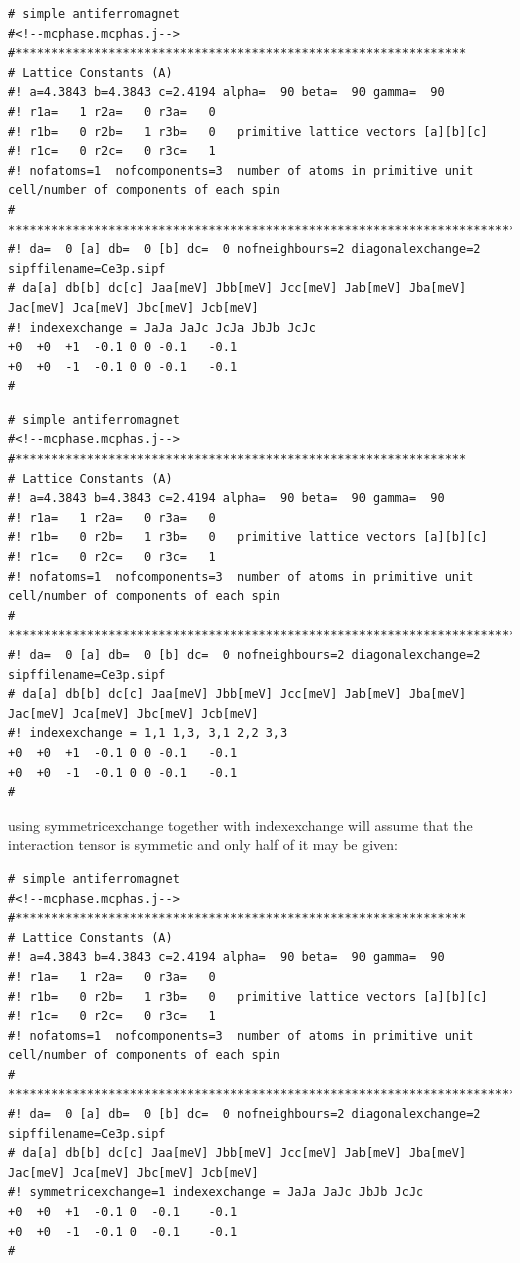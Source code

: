 {\small
\begin{verbatim} 
# simple antiferromagnet 
#<!--mcphase.mcphas.j-->
#***************************************************************
# Lattice Constants (A)
#! a=4.3843 b=4.3843 c=2.4194 alpha=  90 beta=  90 gamma=  90
#! r1a=   1 r2a=   0 r3a=   0
#! r1b=   0 r2b=   1 r3b=   0   primitive lattice vectors [a][b][c]
#! r1c=   0 r2c=   0 r3c=   1
#! nofatoms=1  nofcomponents=3  number of atoms in primitive unit cell/number of components of each spin
# ****************************************************************************
#! da=  0 [a] db=  0 [b] dc=  0 nofneighbours=2 diagonalexchange=2  sipffilename=Ce3p.sipf
# da[a] db[b] dc[c] Jaa[meV] Jbb[meV] Jcc[meV] Jab[meV] Jba[meV] Jac[meV] Jca[meV] Jbc[meV] Jcb[meV]
#! indexexchange = JaJa JaJc JcJa JbJb JcJc
+0	+0	+1	-0.1 0 0 -0.1	-0.1  
+0	+0	-1	-0.1 0 0 -0.1	-0.1  
#\end{verbatim}
}

{\small
\begin{verbatim} 
# simple antiferromagnet 
#<!--mcphase.mcphas.j-->
#***************************************************************
# Lattice Constants (A)
#! a=4.3843 b=4.3843 c=2.4194 alpha=  90 beta=  90 gamma=  90
#! r1a=   1 r2a=   0 r3a=   0
#! r1b=   0 r2b=   1 r3b=   0   primitive lattice vectors [a][b][c]
#! r1c=   0 r2c=   0 r3c=   1
#! nofatoms=1  nofcomponents=3  number of atoms in primitive unit cell/number of components of each spin
# ****************************************************************************
#! da=  0 [a] db=  0 [b] dc=  0 nofneighbours=2 diagonalexchange=2 sipffilename=Ce3p.sipf
# da[a] db[b] dc[c] Jaa[meV] Jbb[meV] Jcc[meV] Jab[meV] Jba[meV] Jac[meV] Jca[meV] Jbc[meV] Jcb[meV]
#! indexexchange = 1,1 1,3, 3,1 2,2 3,3
+0	+0	+1	-0.1 0 0 -0.1	-0.1  
+0	+0	-1	-0.1 0 0 -0.1	-0.1  
#\end{verbatim}
}


using symmetricexchange together with indexexchange will assume that the interaction tensor is symmetic and 
only half of it may be given:

{\small
\begin{verbatim} 
# simple antiferromagnet 
#<!--mcphase.mcphas.j-->
#***************************************************************
# Lattice Constants (A)
#! a=4.3843 b=4.3843 c=2.4194 alpha=  90 beta=  90 gamma=  90
#! r1a=   1 r2a=   0 r3a=   0
#! r1b=   0 r2b=   1 r3b=   0   primitive lattice vectors [a][b][c]
#! r1c=   0 r2c=   0 r3c=   1
#! nofatoms=1  nofcomponents=3  number of atoms in primitive unit cell/number of components of each spin
# ****************************************************************************
#! da=  0 [a] db=  0 [b] dc=  0 nofneighbours=2 diagonalexchange=2 sipffilename=Ce3p.sipf
# da[a] db[b] dc[c] Jaa[meV] Jbb[meV] Jcc[meV] Jab[meV] Jba[meV] Jac[meV] Jca[meV] Jbc[meV] Jcb[meV]
#! symmetricexchange=1 indexexchange = JaJa JaJc JbJb JcJc
+0	+0	+1	-0.1 0  -0.1	-0.1  
+0	+0	-1	-0.1 0  -0.1	-0.1  
#\end{verbatim}
}



